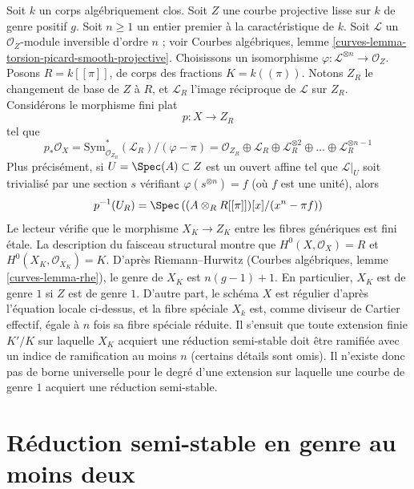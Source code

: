 \begin{example}
\label{example-extension-necessary-genus-one}
Soit $k$ un corps algébriquement clos. Soit $Z$ une courbe projective lisse
sur $k$ de genre positif $g$. Soit $n\geq1$ un entier premier à la
caractéristique de $k$. Soit $\mathcal{L}$ un $\mathcal{O}_Z$-module
inversible d'ordre $n$ ; voir Courbes algébriques, lemme
\ref{curves-lemma-torsion-picard-smooth-projective}. Choisissons un
isomorphisme $\varphi:\mathcal{L}^{\otimes n}\to\mathcal{O}_Z$.
Posons $R=k[[\pi]]$, de corps des fractions $K=k((\pi))$. Notons $Z_R$ le
changement de base de $Z$ à $R$, et $\mathcal{L}_R$ l'image réciproque de
$\mathcal{L}$ sur $Z_R$. Considérons le morphisme fini plat
$$
p : X \longrightarrow Z_R
$$
tel que
$$
p_*\mathcal{O}_X =
\text{Sym}^*_{\mathcal{O}_{Z_R}}(\mathcal{L}_R)/(\varphi - \pi) =
\mathcal{O}_{Z_R} \oplus \mathcal{L}_R \oplus
\mathcal{L}_R^{\otimes 2} \oplus \ldots \oplus \mathcal{L}_R^{\otimes n - 1}
$$
Plus précisément, si $U=\Spec(A)\subset Z$ est un ouvert affine tel que
$\mathcal{L}|_U$ soit trivialisé par une section $s$ vérifiant
$\varphi(s^{\otimes n})=f$ (où $f$ est une unité), alors
$$
p^{-1}(U_R) = \Spec\left(
(A \otimes_R R[[\pi]])[x]/(x^n - \pi f)
\right)
$$
Le lecteur vérifie que le morphisme $X_K\to Z_K$ entre les fibres
génériques est fini étale. La description du faisceau structural montre
que $H^0(X,\mathcal{O}_X)=R$ et $H^0(X_K,\mathcal{O}_{X_K})=K$.
D'après Riemann--Hurwitz (Courbes algébriques, lemme
\ref{curves-lemma-rhe}), le genre de $X_K$ est $n(g-1)+1$. En particulier,
$X_K$ est de genre $1$ si $Z$ est de genre $1$. D'autre part, le schéma
$X$ est régulier d'après l'équation locale ci-dessus, et la fibre spéciale
$X_k$ est, comme diviseur de Cartier effectif, égale à $n$ fois sa fibre
spéciale réduite. Il s'ensuit que toute extension finie $K'/K$ sur laquelle
$X_K$ acquiert une réduction semi-stable doit être ramifiée avec un indice
de ramification au moins $n$ (certains détails sont omis). Il n'existe donc
pas de borne universelle pour le degré d'une extension sur laquelle une
courbe de genre $1$ acquiert une réduction semi-stable.
\end{example}






\section{Réduction semi-stable en genre au moins deux}
\label{section-semistable-reduction-genus-at-least-two}

